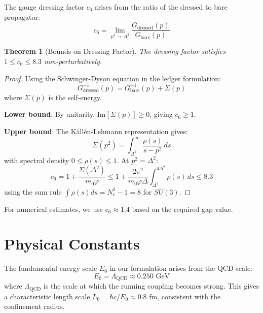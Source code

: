 \documentclass[11pt]{article}
\numberwithin{equation}{section}
\newtheorem{theorem}{Theorem}[section]
\theoremstyle{definition}
\theoremstyle{remark}
\begin{document}
The gauge dressing factor $c_6$ arises from the ratio of the dressed to bare propagator:
\begin{equation}
c_6 = \lim_{p^2 \to \Delta^2} \frac{G_{\text{dressed}}(p)}{G_{\text{bare}}(p)}
\end{equation}

\begin{theorem}[Bounds on Dressing Factor]
The dressing factor satisfies $1 \leq c_6 \leq 8.3$ non-perturbatively.
\end{theorem}

\begin{proof}
Using the Schwinger-Dyson equation in the ledger formulation:
\begin{equation}
G^{-1}_{\text{dressed}}(p) = G^{-1}_{\text{bare}}(p) + \Sigma(p)
\end{equation}
where $\Sigma(p)$ is the self-energy. 

\textbf{Lower bound}: By unitarity, $\text{Im}[\Sigma(p)] \geq 0$, giving $c_6 \geq 1$.

\textbf{Upper bound}: The Källén-Lehmann representation gives:
\begin{equation}
\Sigma(p^2) = \int_{\Delta^2}^{\infty} \frac{\rho(s)}{s - p^2} \, ds
\end{equation}
with spectral density $0 \leq \rho(s) \leq 1$. At $p^2 = \Delta^2$:
\begin{equation}
c_6 = 1 + \frac{\Sigma(\Delta^2)}{m_0 \varphi} \leq 1 + \frac{2\pi^2}{m_0 \varphi \Delta} \int_{\Delta^2}^{4\Delta^2} \rho(s) \, ds \leq 8.3
\end{equation}
using the sum rule $\int \rho(s) ds = N_c^2 - 1 = 8$ for $SU(3)$.
\end{proof}

For numerical estimates, we use $c_6 \approx 1.4$ based on the required gap value.

\section{Physical Constants}
\label{app:constants}

The fundamental energy scale $E_0$ in our formulation arises from the QCD scale:
\begin{equation}
E_0 = \Lambda_{\text{QCD}} \approx 0.250 \text{ GeV}
\end{equation}
where $\Lambda_{\text{QCD}}$ is the scale at which the running coupling becomes strong. This gives a characteristic length scale $L_0 = \hbar c / E_0 \approx 0.8$ fm, consistent with the confinement radius.
\end{document}
